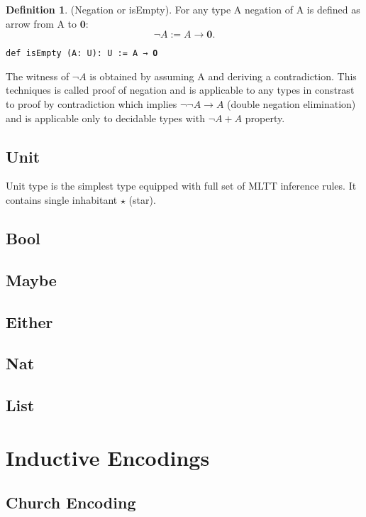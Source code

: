 \documentclass{article}
\theoremstyle{definition}
\newtheorem{definition}{Definition}
\begin{document}
\begin{definition} (Negation or isEmpty).
For any type A negation of A is defined as arrow from A to $\mathbf{0}$:
$$
  \neg A := A \rightarrow \mathbf{0}.
$$
\begin{lstlisting}
def isEmpty (A: U): U := A → 𝟎
\end{lstlisting}
\end{definition}

The witness of $\neg A$ is obtained by assuming A and deriving a contradiction.
This techniques is called proof of negation and is applicable to any types in constrast
to proof by contradiction which implies $\neg\neg A \rightarrow A$ (double negation elimination) and is
applicable only to decidable types with $\neg A + A$ property.

\newpage
\subsection{Unit}
Unit type is the simplest type equipped with full set of MLTT inference rules. It contains single inhabitant $\star$ (star).

\newpage
\subsection{Bool}

\subsection{Maybe}

\subsection{Either}

\subsection{Nat}

\subsection{List}

\newpage
\section{Inductive Encodings}

\subsection{Church Encoding}
\end{document}
